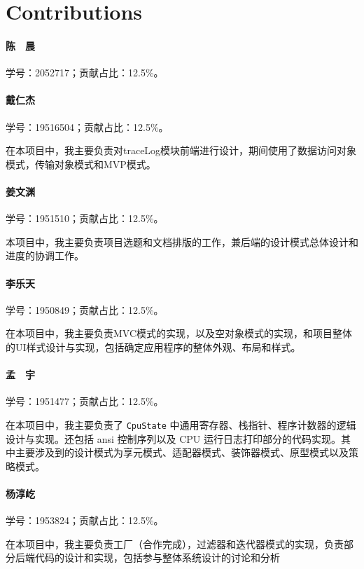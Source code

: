 \newpage
\section*{Contributions}

\paragraph*{陈　晨} 学号：2052717；贡献占比：12.5\%。


\paragraph*{戴仁杰} 学号：19516504；贡献占比：12.5\%。

在本项目中，我主要负责对traceLog模块前端进行设计，期间使用了数据访问对象模式，传输对象模式和MVP模式。

\paragraph*{姜文渊} 学号：1951510；贡献占比：12.5\%。

本项目中，我主要负责项目选题和文档排版的工作，兼后端的设计模式总体设计和进度的协调工作。

\paragraph*{李乐天} 学号：1950849；贡献占比：12.5\%。

在本项目中，我主要负责MVC模式的实现，以及空对象模式的实现，和项目整体的UI样式设计与实现，包括确定应用程序的整体外观、布局和样式。

\paragraph*{孟　宇} 学号：1951477；贡献占比：12.5\%。

​在本项目中，我主要负责了 \lstinline{CpuState} 中通用寄存器、栈指针、程序计数器的逻辑设计与实现。还包括 ansi 控制序列以及 CPU 运行日志打印部分的代码实现。其中主要涉及到的设计模式为享元模式、适配器模式、装饰器模式、原型模式以及策略模式。

\paragraph*{杨淳屹} 学号：1953824；贡献占比：12.5\%。

在本项目中，我主要负责工厂（合作完成），过滤器和迭代器模式的实现，负责部分后端代码的设计和实现，包括参与整体系统设计的讨论和分析

